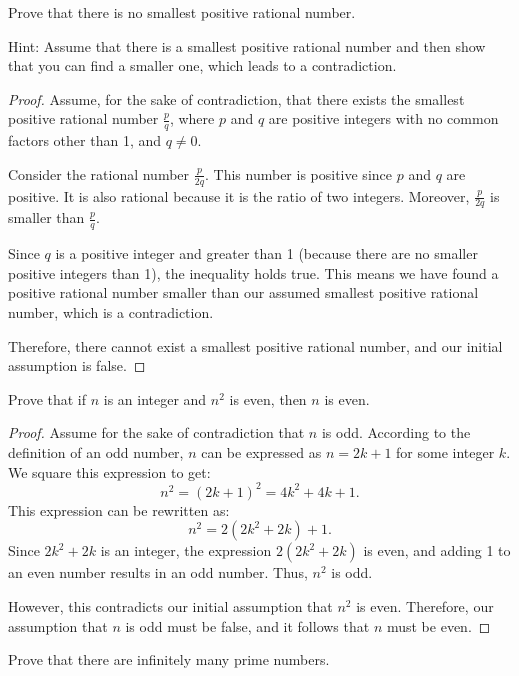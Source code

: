 \documentclass[
	12pt, %
	fleqn, %
	a4paper, %
]{LegrandOrangeBook}
\begin{document}
\begin{exercise}
Prove that there is no smallest positive rational number.
\end{exercise}
Hint: Assume that there is a smallest positive rational number and then show that you can find a smaller one, which leads to a contradiction.
\begin{proof}
Assume, for the sake of contradiction, that there exists the smallest positive rational number \( \frac{p}{q} \), where \( p \) and \( q \) are positive integers with no common factors other than 1, and \( q \neq 0 \).

Consider the rational number \( \frac{p}{2q} \). This number is positive since \( p \) and \( q \) are positive. It is also rational because it is the ratio of two integers. Moreover, \( \frac{p}{2q} \) is smaller than \( \frac{p}{q} \).

Since \( q \) is a positive integer and greater than 1 (because there are no smaller positive integers than 1), the inequality holds true. This means we have found a positive rational number smaller than our assumed smallest positive rational number, which is a contradiction.

Therefore, there cannot exist a smallest positive rational number, and our initial assumption is false.
\end{proof}

\begin{exercise}
Prove that if \( n \) is an integer and \( n^2 \) is even, then \( n \) is even.
\end{exercise}

\begin{proof}
Assume for the sake of contradiction that \( n \) is odd. According to the definition of an odd number, \( n \) can be expressed as \( n = 2k + 1 \) for some integer \( k \). We square this expression to get:
\[ n^2 = (2k + 1)^2 = 4k^2 + 4k + 1. \]
This expression can be rewritten as:
\[ n^2 = 2(2k^2 + 2k) + 1. \]
Since \( 2k^2 + 2k \) is an integer, the expression \( 2(2k^2 + 2k) \) is even, and adding 1 to an even number results in an odd number. Thus, \( n^2 \) is odd.

However, this contradicts our initial assumption that \( n^2 \) is even. Therefore, our assumption that \( n \) is odd must be false, and it follows that \( n \) must be even.
\end{proof}

\begin{exercise}
Prove that there are infinitely many prime numbers.
\end{exercise}
\end{document}
